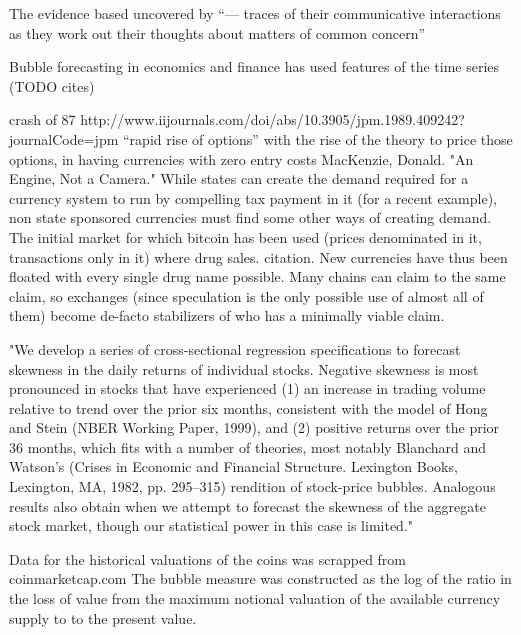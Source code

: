 The evidence based uncovered by “— traces of their communicative interactions as they work out their thoughts about matters of common concern” 


Bubble forecasting in economics and finance has used features of the time series (TODO cites)


crash of 87 http://www.iijournals.com/doi/abs/10.3905/jpm.1989.409242?journalCode=jpm “rapid rise of options” with the rise of the theory to price those options, in having currencies with zero entry costs
MacKenzie, Donald. "An Engine, Not a Camera."
While states can create the demand required for a currency system to run by compelling tax payment in it (for a recent example), non state sponsored currencies must find some other ways of creating demand.
The initial market for which bitcoin has been used (prices denominated in it, transactions only in it) where drug sales. citation.
New currencies have thus been floated with every single drug name possible. Many chains can claim to the same claim, so exchanges (since speculation is the only possible use of almost all of them) become de-facto stabilizers of who has a minimally viable claim. 


"We develop a series of cross-sectional regression specifications to forecast skewness in the daily returns of individual stocks. Negative skewness is most pronounced in stocks that have experienced (1) an increase in trading volume relative to trend over the prior six months, consistent with the model of Hong and Stein (NBER Working Paper, 1999), and (2) positive returns over the prior 36 months, which fits with a number of theories, most notably Blanchard and Watson's (Crises in Economic and Financial Structure. Lexington Books, Lexington, MA, 1982, pp. 295–315) rendition of stock-price bubbles. Analogous results also obtain when we attempt to forecast the skewness of the aggregate stock market, though our statistical power in this case is limited."






Data for the historical valuations of the coins was scrapped from coinmarketcap.com The bubble measure was constructed as the log of the ratio in the loss of value from the maximum notional valuation of the available currency supply to to the present value. 

